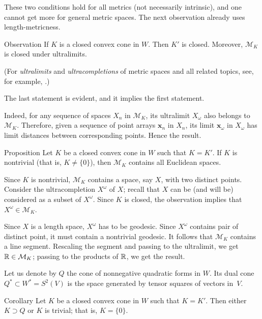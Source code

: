 \documentclass[a4paper,10pt]{article}
\begin{document}
These two conditions hold for all metrics (not necessarily intrinsic),
and one cannot get more for general metric spaces.
The next observation already uses length-metricness.

\begin{thm}{Observation}
If $K$ is a closed convex cone in $W$.
Then $K'$ is closed.
Moreover, $\mathcal{M}_K$ is closed under ultralimits.
\end{thm}


(For \emph{ultralimits} and \emph{ultracompletions} of metric spaces and all related topics, see, for example, \cite{petrunin2023}.)

The last statement is evident, and it implies the first statement.

Indeed, for any sequence of spaces $X_n$ in $\mathcal{M}_K$, its ultralimit $X_\omega$ also belongs to $\mathcal{M}_K$.
Therefore, given a sequence of point arrays $\bm{x}_n$ in $X_n$,
its limit $\bm{x}_\omega$ in $X_\omega$ has limit distances between corresponding points.
Hence the result.
\qeds

\begin{thm}{Proposition}\label{prop:Associated form}
Let $K$ be a closed convex cone in $W$ such that $K=K'$.
If $K$ is nontrivial (that is, $K\ne \{0\}$), then $\mathcal{M}_K$ contains all Euclidean spaces.
\end{thm}

Since $K$ is nontrivial, $\mathcal{M}_K$ contains a space, say $X$, with two distinct points.
Consider the ultracompletion $X^\omega$ of $X$;
recall that $X$ can be (and will be) considered as a subset of $X^\omega$.
Since $K$ is closed, the observation implies that $X^\omega\in \mathcal{M}_K$.

Since  $X$ is a length space, $X^\omega$ has to be geodesic.
Since $X^\omega$ contains pair of distinct point, it must contain a nontrivial geodesic.
It follows that $\mathcal{M}_K$ contains a line segment.
Rescaling the segment and passing to the ultralimit, we get $\mathbb{R}\in \mathcal{M}_K$;
passing to the products of $\mathbb{R}$, we get the result. 
\qeds

Let us denote by $Q$ the cone of nonnegative quadratic forms in $W$.
Its dual cone $Q^*\subset W^*=S^2(V)$ is the space generated by tensor squares of vectors in~$V$.

\begin{thm}{Corollary}
Let $K$ be a closed convex cone in $W$ such that $K=K'$.
Then either $K\supset Q$ or $K$ is trivial; that is, $K=\{0\}$.
\end{thm}
\end{document}
